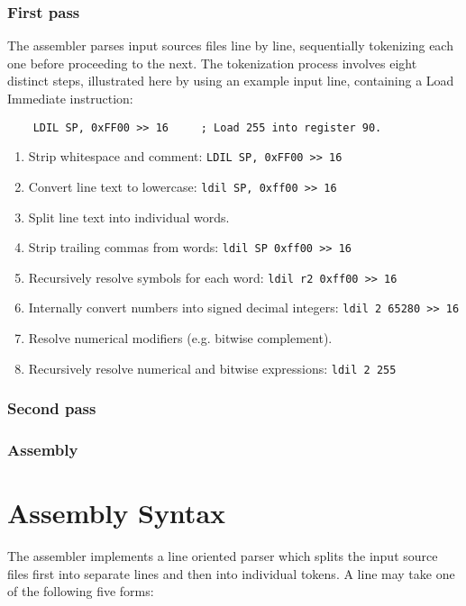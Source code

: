 \documentclass[12pt,twoside]{report}
\begin{document}
\subsection{First pass}

The assembler parses input sources files line by line, sequentially
tokenizing each one before proceeding to the next. The tokenization
process involves eight distinct steps, illustrated here by using an
example input line, containing a Load Immediate instruction:

\begin{verbatim}
    LDIL SP, 0xFF00 >> 16     ; Load 255 into register 90.
\end{verbatim}

\begin{enumerate}
\item Strip whitespace and comment: \texttt{LDIL SP, 0xFF00 >> 16}
\item Convert line text to lowercase: \texttt{ldil SP, 0xff00 >> 16}
\item Split line text into individual words.
\item Strip trailing commas from words: \texttt{ldil SP 0xff00 >> 16}
\item Recursively resolve symbols for each word: \texttt{ldil r2 0xff00 >> 16}
\item Internally convert numbers into signed decimal integers: \texttt{ldil 2 65280 >> 16}
\item Resolve numerical modifiers (e.g. bitwise complement).
\item Recursively resolve numerical and bitwise expressions: \texttt{ldil 2 255}
\end{enumerate}

\subsection{Second pass}

\subsection{Assembly}

\chapter{Assembly Syntax}

The assembler implements a line oriented parser which splits the input
source files first into separate lines and then into individual
tokens. A line may take one of the following five forms:
\end{document}
